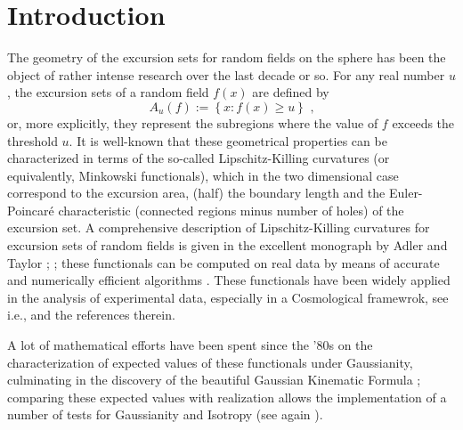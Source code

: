 \documentclass[aps,prd,showpacs,superscriptaddress,groupedaddress]{revtex4-1}  %
\begin{document}
\section{Introduction}

The geometry of the excursion sets for random fields on the sphere has been the object of rather intense research over the last decade or so. For any real number $u$, the excursion sets of a random field $f(x)$ are defined by%
\begin{equation}
A_{u}(f):=\left\{ x:f(x) \geq u\right\} \text{ ,}
\end{equation}
or, more explicitly, they represent the subregions where the value of $f$ exceeds the threshold $u$. It is well-known that these geometrical properties can be characterized in terms of the so-called Lipschitz-Killing curvatures (or equivalently, Minkowski functionals), which in the two dimensional case correspond to the excursion area, (half) the boundary length and the Euler-Poincar\'e characteristic (connected regions minus number of holes) of the excursion set. A comprehensive description of Lipschitz-Killing curvatures for excursion sets of random fields is given in the excellent monograph by Adler and Taylor \cite{Adler e Taylor}; ; these functionals can be computed on real data by means of
accurate and numerically efficient algorithms \cite{KLENK2006127, Guderlei2007, Gay2012_NGPeaks}. These functionals have been widely applied in the analysis of experimental data, especially in a Cosmological framewrok, see i.e.,  \cite{natoli2010mfBoomrang, matsubara2010_mfFnl,
  ducout2013_mfFnl, gratten2012_mfLSSreview, munshi2013_mfSkewCl,planck2013_IS, planck2014-a18} and the references therein.


A lot of mathematical efforts have been spent since the '80s on the characterization of expected values of these functionals under Gaussianity, culminating in the discovery of the beautiful Gaussian Kinematic Formula \cite{TaylorAdler2009}; comparing these expected values with realization allows the implementation of a number of tests for Gaussianity and Isotropy (see again \cite{planck2013-p09, planck2014-a18}).
\end{document}
